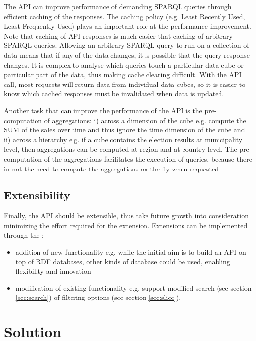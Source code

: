 \documentclass{llncs}
\begin{document}
The API can improve performance of demanding SPARQL queries through efficient caching of the responses. The caching policy (e.g. Least Recently Used, Least Frequently Used) plays an important role at the performance improvement. Note that caching of API responses is much easier that caching of arbitrary SPARQL queries. Allowing an arbitrary SPARQL query to run on a collection of data means that if any of the data changes, it is possible that the query response changes.  It is complex to analyse which queries touch a particular data cube or particular part of the data, thus making cache clearing difficult.  With the API call, most requests will return data from individual data cubes, so it is easier to know which cached responses must be invalidated when data is updated.

Another task that can improve the performance of the API is the pre-computation of aggregations: i) across a dimension of the cube e.g. compute the SUM of the sales over time and thus ignore the time dimension of the cube and ii) across a hierarchy e.g. if a cube contains the election results at municipality level, then aggregations can be computed at region and at country level. The pre-computation of the aggregations facilitates the execution of queries, because there in not the need to compute the aggregations on-the-fly when requested. 


\subsection{Extensibility}

Finally, the API should be extensible, thus take future growth into consideration minimizing the effort required for the extension. Extensions can be implemented through the :
\begin{itemize}
\item addition of new functionality e.g. while the initial aim is to build an API on top of RDF databases, other kinds of database could be used, enabling flexibility and innovation
\item modification of existing functionality e.g. support modified search (see section \ref{sec:search}) of filtering options (see section \ref{sec:slice}).
\end{itemize} 


\section{Solution}\label{sec:solution}
\end{document}
